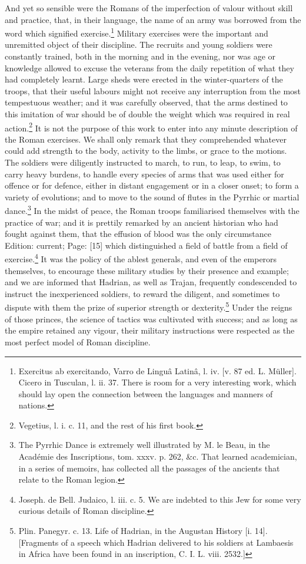 And yet so sensible were the Romans of the imperfection of valour without skill and practice, that, in their language, the name of an army was borrowed from the word which signified exercise.\footnote{Exercitus ab exercitando, Varro de Linguâ Latinâ, l. iv. [v. 87 ed. L. Müller]. Cicero in Tusculan, l. ii. 37. There is room for a very interesting work, which should lay open the connection between the languages and manners of nations.} Military exercises were the important and unremitted object of their discipline. The recruits and young soldiers were constantly trained, both in the morning and in the evening, nor was age or knowledge allowed to excuse the veterans from the daily repetition of what they had completely learnt. Large sheds were erected in the winter-quarters of the troops, that their useful labours might not receive any interruption from the most tempestuous weather; and it was carefully observed, that the arms destined to this imitation of war should be of double the weight which was required in real action.\footnote{Vegetius, l. i. c. 11, and the rest of his first book.} It is not the purpose of this work to enter into any minute description of the Roman exercises. We shall only remark that they comprehended whatever could add strength to the body, activity to the limbs, or grace to the motions. The soldiers were diligently instructed to march, to run, to leap, to swim, to carry heavy burdens, to handle every species of arms that was used either for offence or for defence, either in distant engagement or in a closer onset; to form a variety of evolutions; and to move to the sound of flutes in the Pyrrhic or martial dance.\footnote{The Pyrrhic Dance is extremely well illustrated by M. le Beau, in the Académie des Inscriptions, tom. xxxv. p. 262, \&c. That learned academician, in a series of memoirs, has collected all the passages of the ancients that relate to the Roman legion.} In the midst of peace, the Roman troops familiarised themselves with the practice of war; and it is prettily remarked by an ancient historian who had fought against them, that the effusion of blood was the only circumstance Edition: current; Page: [15] which distinguished a field of battle from a field of exercise.\footnote{Joseph. de Bell. Judaico, l. iii. c. 5. We are indebted to this Jew for some very curious details of Roman discipline.} It was the policy of the ablest generals, and even of the emperors themselves, to encourage these military studies by their presence and example; and we are informed that Hadrian, as well as Trajan, frequently condescended to instruct the inexperienced soldiers, to reward the diligent, and sometimes to dispute with them the prize of superior strength or dexterity.\footnote{Plin. Panegyr. c. 13. Life of Hadrian, in the Augustan History [i. 14]. [Fragments of a speech which Hadrian delivered to his soldiers at Lambaesis in Africa have been found in an inscription, C. I. L. viii. 2532.]} Under the reigns of those princes, the science of tactics was cultivated with success; and as long as the empire retained any vigour, their military instructions were respected as the most perfect model of Roman discipline.

